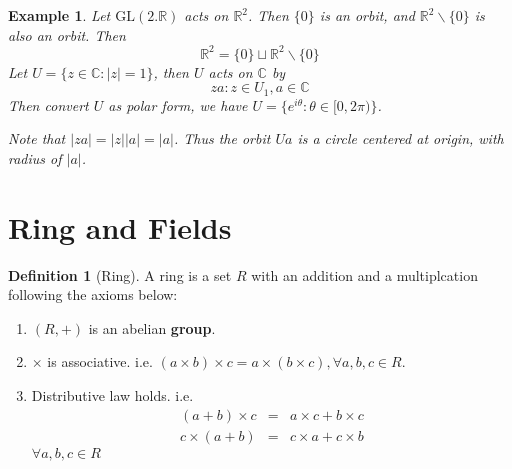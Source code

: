 \documentclass{article}
\theoremstyle{MyNonumberplain}
\theoremstyle{break}
\newcommand{\tmop}{\text}
\theoremstyle{break}
\newtheorem{example}{Example}[section]
\theoremstyle{break}
\theoremstyle{definition}
\theoremstyle{break}
\newtheorem{definition}{Definition}[section]
\begin{document}
\begin{expbox}
    \begin{example}
        Let $\tmop{GL} (2.\mathbb{R})$ acts on $\mathbb{R}^2$. Then $\{ 0 \}$ is an
        orbit, and $\mathbb{R}^2 \backslash \{ 0 \}$ is also an orbit. Then
        \[ \mathbb{R}^2 = \{ 0 \} \sqcup \mathbb{R}^2 \backslash \{ 0 \} \]
        Let $U = \{ z \in \mathbb{C}: | z | = 1 \}$, then $U$ acts on $\mathbb{C}$ by
        \[ z a : z \in U_1, a \in \mathbb{C} \]
        Then convert $U$ as polar form, we have $U = \{ e^{i \theta} : \theta \in [0,
        2 \pi) \}$.\bigskip   

        Note that $| z a | = | z |  | a | = | a |$. Thus the orbit $U a$ is a circle
        centered at origin, with radius of $| a |$.
    \end{example}
\end{expbox}

\newpage

\setcounter{section}{17}

\section{Ring and Fields}

\begin{defbox}
    \begin{definition}[Ring]
        A ring is a set $R$ with an addition and a multiplcation following the axioms
        below:\\
        \begin{enumerate}
        \item $(R, +)$ is an abelian \textbf{group}.\bigskip
        
        \item $\times$ is associative. i.e. $(a \times b) \times c = a \times (b
        \times c), \forall a, b, c \in R$.\bigskip
        
        \item Distributive law holds. i.e.
        \begin{eqnarray*}
            (a + b) \times c & = & a \times c + b \times c\\
            c \times (a + b) & = & c \times a + c \times b
        \end{eqnarray*}
        $\forall a, b, c \in R$
        \end{enumerate}
    \end{definition}
\end{defbox}
\end{document}
